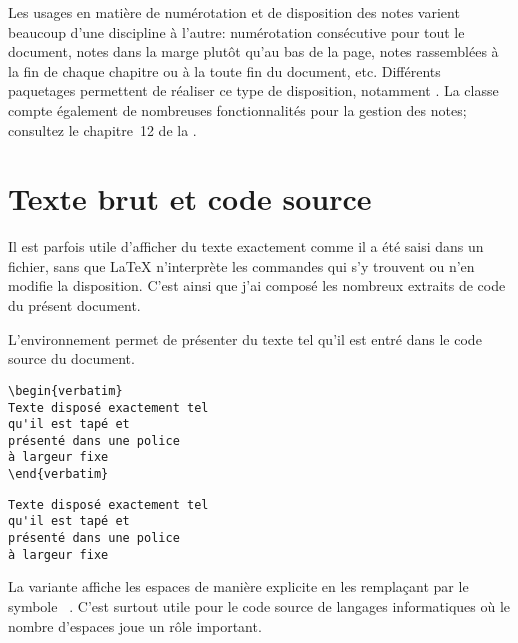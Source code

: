 Les usages en matière de numérotation et de disposition des notes
varient beaucoup d'une discipline à l'autre: numérotation consécutive
pour tout le document, notes dans la marge plutôt qu'au bas de la
page, notes rassemblées à la fin de chaque chapitre ou à la toute fin
du document, etc. Différents paquetages permettent de réaliser ce type
de disposition, notamment  \citep{footmisc}. La classe
 compte également de nombreuses fonctionnalités pour la
gestion des notes; consultez le chapitre~12 de la %
.


\section{Texte brut et code source}
\label{sec::apparence:code}

Il est parfois utile d'afficher du texte exactement comme il a été
saisi dans un fichier, sans que {\LaTeX} n'interprète les commandes
qui s'y trouvent ou n'en modifie la disposition. C'est ainsi que j'ai
composé les nombreux extraits de code du présent document.

L'environnement  permet de présenter du texte tel qu'il
est entré dans le code source du document.
\begin{demo}
  \begin{texample}
\begin{lstlisting}
\begin{verbatim}
Texte disposé exactement tel
qu'il est tapé et
présenté dans une police
à largeur fixe
\end{verbatim}
\end{lstlisting}
    \producing
\begin{verbatim}
Texte disposé exactement tel
qu'il est tapé et
présenté dans une police
à largeur fixe
\end{verbatim}
\end{texample}
\end{demo}
La variante  affiche les espaces de manière explicite en
les remplaçant par le symbole \verb*| |. C'est surtout utile pour le
code source de langages informatiques où le nombre d'espaces joue un rôle
important.

